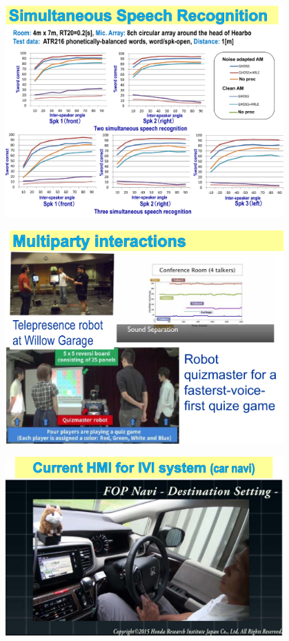 \documentclass[xetex,mathserif,serif]{beamer}
\begin{document}
	\begin{frame}
		\begin{center}
			\includegraphics[width=0.8\textwidth]{okuno14.png}
		\end{center}
	\end{frame}

	\begin{frame}
		\begin{center}
			\includegraphics[width=0.8\textwidth]{okuno15.png}
		\end{center}
	\end{frame}

	\begin{frame}
		\begin{center}
			\includegraphics[width=0.8\textwidth]{okuno16.png}
		\end{center}
	\end{frame}
\end{document}
